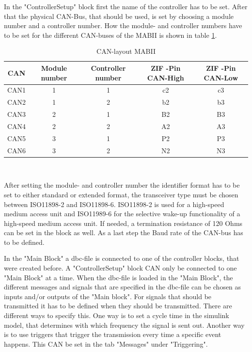 \documentclass[ExampleMasters.tex]{subfiles}
\begin{document}
In the "ControllerSetup" block first the name of the controller has to be set. After that the physical CAN-Bus, that should be used, is set by choosing a module number and a controller number. How the module- and controller numbers have to be set for the different CAN-buses of the \gls{MABII} is shown in table \ref{tab:CAN-layout}.
\begin{table}[h]
	\centering
	\caption{CAN-layout MABII}
	\label{tab:CAN-layout}
	\begin{tabular}{c|c|c|c|c|}
		CAN   & Module number & Controller number & \gls{ZIF} -Pin CAN-High & \gls{ZIF} -Pin \gls{CAN}-Low  \\ \hline
		CAN1     &       1 & 1  & c2 & c3         \\
		CAN2   &      1 & 2  & b2 & b3    \\
		CAN3 &      2 & 1 & B2 & B3        \\
		CAN4& 2 & 2 & A2 & A3  \\
		CAN5& 3 & 1 & P2 & P3 \\
		CAN6& 3 & 2 & N2 & N3 \\
	\end{tabular} \\
\end{table}

After setting the module- and controller number the identifier format has to be set to either standard or extended format, the transceiver type must be chosen between ISO11898-2 and ISO11898-6. ISO11898-2 is used for a high-speed medium access unit and ISO11989-6 for the selective wake-up functionality of a high-speed medium access unit. If needed, a termination resistance of 120 Ohms can be set in the block as well. As a last step the Baud rate of the \gls{CAN}-bus has to be defined.


In the "Main Block" a dbc-file is connected to one of the controller blocks, that were created before. A "ControllerSetup" block \gls{CAN} only be connected to one "Main Block" at a time. When the dbc-file is loaded in the "Main Block", the different messages and signals that are specified in the dbc-file can be chosen as inputs and/or outputs of the "Main block". For signals that should be transmitted it has to be defined when they should be transmitted. There are different ways to specify this. One way is to set a cycle time in the simulink model, that determines with which frequency the signal is sent out. Another way is to use triggers that trigger the transmission every time a specific event happens. This \gls{CAN} be set in the tab "Messages" under "Triggering".
\end{document}
